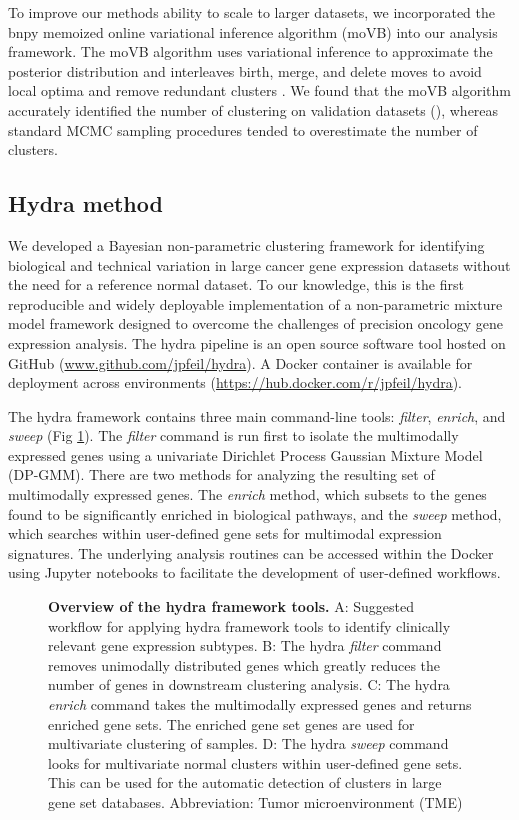 \documentclass[10pt,letterpaper]{article}
\begin{document}
To improve our methods ability to scale to larger datasets, we incorporated the bnpy memoized online variational inference algorithm (moVB) \cite{hughes2013memoized} into our analysis framework. The moVB algorithm uses variational inference to approximate the posterior distribution and interleaves birth, merge, and delete moves to avoid local optima and remove redundant clusters \cite{hughesBnpyReliableScalable}. We found that the moVB algorithm accurately identified the number of clustering on validation datasets (), whereas standard MCMC sampling procedures tended to overestimate the number of clusters.

\subsection*{Hydra method}
We developed a Bayesian non-parametric clustering framework for identifying biological and technical variation in large cancer gene expression datasets without the need for a reference normal dataset. To our knowledge, this is the first reproducible and widely deployable implementation of a non-parametric mixture model framework designed to overcome the challenges of precision oncology gene expression analysis. The hydra pipeline is an open source software tool hosted on GitHub (\url{www.github.com/jpfeil/hydra}). A Docker container is available for deployment across environments (\url{https://hub.docker.com/r/jpfeil/hydra}).

The hydra framework contains three main command-line tools: \textit{filter}, \textit{enrich}, and \textit{sweep} (Fig \ref{overview}). The \textit{filter} command is run first to isolate the multimodally expressed genes using a univariate Dirichlet Process Gaussian Mixture Model (DP-GMM). There are two methods for analyzing the resulting set of multimodally expressed genes. The \textit{enrich} method, which subsets to the genes found to be significantly enriched in biological pathways, and the \textit{sweep} method, which searches within user-defined gene sets for multimodal expression signatures. The underlying analysis routines can be accessed within the Docker using Jupyter notebooks to facilitate the development of user-defined workflows.

\begin{figure}[h!]
	\caption{{\bf Overview of the hydra framework tools.}
		A: Suggested workflow for applying hydra framework tools to identify clinically relevant gene expression subtypes. B: The hydra \textit{filter} command removes unimodally distributed genes which greatly reduces the number of genes in downstream clustering analysis. C: The hydra \textit{enrich} command takes the multimodally expressed genes and returns enriched gene sets. The enriched gene set genes are used for multivariate clustering of samples. D: The hydra
		\textit{sweep} command looks for multivariate normal clusters within user-defined gene sets. This can be used for the automatic detection of clusters in large gene set databases. Abbreviation: Tumor microenvironment (TME) 
		\label{overview}}
\end{figure}
\end{document}
